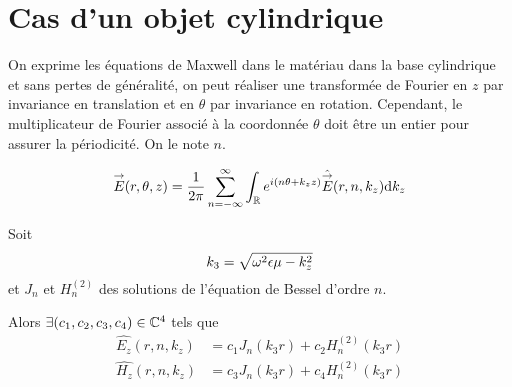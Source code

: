 \section{Cas d'un objet cylindrique}


  \begin{figure}[!hbt]
    \centering
    \begin{tikzpicture}
      
    \end{tikzpicture}
  \end{figure}

  On exprime les équations de Maxwell dans le matériau dans la base cylindrique et sans pertes de généralité, on peut réaliser une transformée de Fourier en \(z\) par invariance en translation et en \(\theta\) par invariance en rotation.
  Cependant, le multiplicateur de Fourier associé à la coordonnée \(\theta\) doit être un entier pour assurer la périodicité. On le note \(n\).

  \begin{equation}
    \vE(r,\theta,z) = \frac{1}{2\pi}\sum_{n=-\infty}^{\infty}\int_{\RR} e^{i(n \theta + k_z z )}\hat{\vE} (r,n,k_z) \dd{k_z}
  \end{equation}

  \begin{prop}
    Soit
    \begin{equation}
      k_3 = \sqrt{\w^2\eps\mu - k_z^2}
    \end{equation}
    et \(J_n\) et \(H_n^{(2)}\) des solutions de l'équation de Bessel d'ordre \(n\).

    Alors \(\exists (c_1,c_2,c_3,c_4) \in \CC^4\) tels que
    \begin{subequations}
      \begin{align}
        \hat{E_z}(r,n,k_z) &= c_1 J_n\left(k_3r\right) + c_2 H_n^{(2)}\left(k_3r\right)
        \\
        \hat{H_z}(r,n,k_z) &= c_3 J_n\left(k_3r\right) + c_4 H_n^{(2)}\left(k_3r\right)
      \end{align}
    \end{subequations}
  \end{prop}

